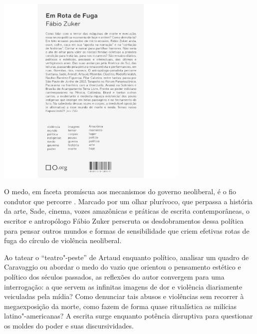 \begin{center}
\hspace*{-2.5cm}
\hspace*{2.5cm}\includegraphics[width=92mm]{./grid/zuker.jpg}
\end{center}

\hspace*{-7cm}\hrulefill\hspace*{-7cm}

\medskip

\noindent{}O medo, em faceta promíscua aos mecanismos do governo neoliberal, é o fio condutor que percorre {}. Marcado por um olhar plurívoco, que perpassa a história da arte, Sade, cinema, vozes amazônicas e práticas de escrita contemporâneas, o escritor e antropólogo Fábio Zuker perscruta os desdobramentos dessa política para pensar outros mundos e formas de sensibilidade que criem efetivas rotas de fuga do círculo de violência neoliberal.

Ao tatear o “teatro"-peste” de Artaud enquanto político, analisar um quadro de Caravaggio ou abordar o medo do vazio que orientou o pensamento estético e político dos séculos passados, as reflexões do autor convergem para uma interrogação: a que servem as infinitas imagens de dor e violência diariamente veiculadas pela mídia? Como denunciar tais abusos e violências sem recorrer à megaexposição da morte, como fazem de forma quase ritualística as milícias latino"-americanas? A escrita surge enquanto potência disruptiva para questionar os moldes do poder e suas discursividades.

\vfill

